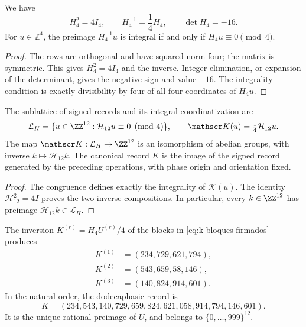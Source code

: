 \begin{lemma}
\label{lem:k-hadamard}
We have
\[
 H_4^2=4I_4,\qquad H_4^{-1}=\frac14H_4,\qquad\det H_4=-16.
\]
For \(u\in\mathbb Z^4\), the preimage \(H_4^{-1}u\) is integral if and
only if \(H_4u\equiv0\pmod4\).
\end{lemma}

\begin{proof}
The rows are orthogonal and have squared norm four; the matrix is
symmetric. This gives \(H_4^2=4I_4\) and the inverse. Integer elimination,
or expansion of the determinant, gives the negative sign and value \(-16\).
The integrality condition is exactly divisibility by four
of all four coordinates of \(H_4u\).
\end{proof}

\begin{definition}
The sublattice of signed records and its integral coordinatization are
\[
 \mathcal L_H=\{u\in\ZZ^{12}:\mathcal H_{12}u\equiv0\pmod4\},
 \qquad \mathscr K(u)=\tfrac14\mathcal H_{12}u.
\]
The map \(\mathscr K:\mathcal L_H\to\ZZ^{12}\) is an isomorphism
of abelian groups, with inverse \(k\mapsto\mathcal H_{12}k\).
The canonical record \(K\) is the image of the signed record generated
by the preceding operations, with phase origin and orientation fixed.
\end{definition}

\begin{proof}
The congruence defines exactly the integrality of \(\mathscr K(u)\).
The identity \(\mathcal H_{12}^2=4I\) proves the two inverse
compositions. In particular, every \(k\in\ZZ^{12}\) has preimage
\(\mathcal H_{12}k\in\mathcal L_H\).
\end{proof}

\begin{proposition}
\label{prop:k-sello}
The inversion \(K^{(r)}=H_4U^{(r)}/4\) of the blocks in
\eqref{eq:k-bloques-firmados} produces
\begin{align*}
 K^{(1)}&=(234,729,621,794),\\
 K^{(2)}&=(543,659,58,146),\\
 K^{(3)}&=(140,824,914,601).
\end{align*}
In the natural order, the dodecaphasic record is
\begin{equation}
 K=(234,543,140,729,659,824,621,058,914,794,146,601).
 \label{eq:k-vector}
\end{equation}
It is the unique rational preimage of \(U\), and belongs to
\(\{0,\ldots,999\}^{12}\).
\end{proposition}

